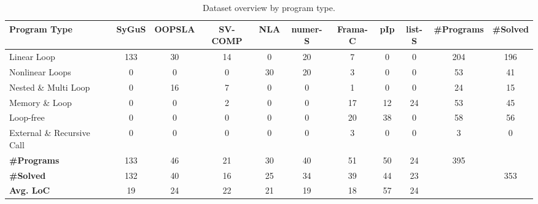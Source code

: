 \begin{table}[htbp]
\centering
\small
\renewcommand{\arraystretch}{0.95}
\setlength{\tabcolsep}{4pt}
\caption{Dataset overview by program type.}
\label{tab:dataset_overview}
\begin{adjustbox}{max width=\textwidth}
\begin{tabular}{
    l
    c
    c
    c
    c
    c
    c
    c
    c
    c
    c
}
\toprule
\textbf{Program Type}  & \textbf{SyGuS} & \textbf{OOPSLA}   & \textbf{SV-COMP}  & \textbf{NLA}  & \textbf{numer-S}  & \textbf{Frama-C}  & \textbf{pIp}  & \textbf{list-S} & \textbf{\#Programs} & \textbf{\#Solved} \\
\midrule
Linear Loop                  & {\cellcolor{figloop!68}133} & {\cellcolor{figloop!55}30} & {\cellcolor{figloop!38}14} & {\cellcolor{figloop!18}0}  & {\cellcolor{figloop!43}20} & {\cellcolor{figcontract!32}7}  & {\cellcolor{figcontract!18}0}  & {\cellcolor{figcontract!18}0}  & 204 & 196 \\
Nonlinear Loops              & {\cellcolor{figloop!18}0}   & {\cellcolor{figloop!18}0}  & {\cellcolor{figloop!18}0}  & {\cellcolor{figloop!55}30} & {\cellcolor{figloop!43}20} & {\cellcolor{figcontract!24}3}  & {\cellcolor{figcontract!18}0}  & {\cellcolor{figcontract!18}0}  & 53  & 41  \\
Nested \& Multi Loop         & {\cellcolor{figloop!18}0}   & {\cellcolor{figloop!40}16} & {\cellcolor{figloop!28}7}  & {\cellcolor{figloop!18}0}  & {\cellcolor{figloop!18}0}  & {\cellcolor{figcontract!20}1}  & {\cellcolor{figcontract!18}0}  & {\cellcolor{figcontract!18}0}  & 24  & 15  \\
Memory \& Loop               & {\cellcolor{figloop!18}0}   & {\cellcolor{figloop!18}0}  & {\cellcolor{figloop!22}2}  & {\cellcolor{figloop!18}0}  & {\cellcolor{figloop!18}0}  & {\cellcolor{figcontract!38}17} & {\cellcolor{figcontract!35}12} & {\cellcolor{figcontract!38}24} & 53  & 45  \\
Loop-free               & {\cellcolor{figloop!18}0}   & {\cellcolor{figloop!18}0}  & {\cellcolor{figloop!18}0}  & {\cellcolor{figloop!18}0}  & {\cellcolor{figloop!18}0}  & {\cellcolor{figcontract!48}20} & {\cellcolor{figcontract!62}38} & {\cellcolor{figcontract!18}0}  & 58  & 56  \\
External \& Recursive Call  & {\cellcolor{figloop!18}0}   & {\cellcolor{figloop!18}0}  & {\cellcolor{figloop!18}0}  & {\cellcolor{figloop!18}0}  & {\cellcolor{figloop!18}0}  & {\cellcolor{figcontract!24}3}  & {\cellcolor{figcontract!18}0}  & {\cellcolor{figcontract!18}0}  & 3   & 0   \\
\midrule
\textbf{\#Programs} & 133 & 46 & 21 & 30 & 40 &  51 & 50 & 24 & 395  \\
\textbf{\#Solved}  & 132 & 40 & 16 & 25 & 34 &  39 & 44 & 23 &      & 353 \\
\textbf{Avg. LoC}  & 19  & 24 & 22 & 21 & 19 &  18 & 57 & 24 &      &     \\
\bottomrule
\end{tabular}%
\end{adjustbox}
\end{table}

